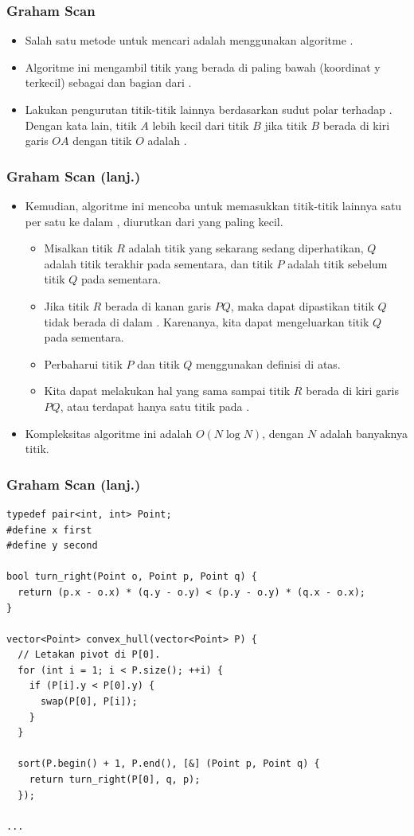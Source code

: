 \begin{frame}
\frametitle{Graham Scan}
\begin{itemize}
  \item Salah satu metode untuk mencari \fconvexHull adalah menggunakan algoritme .
  \item Algoritme ini mengambil titik yang berada di paling bawah (koordinat y terkecil) sebagai \fpivot dan bagian dari \fconvexHull.
  \item Lakukan pengurutan titik-titik lainnya berdasarkan sudut polar terhadap \fpivot. Dengan kata lain, titik $A$ lebih kecil dari titik $B$ jika titik $B$ berada di kiri garis $OA$ dengan titik $O$ adalah \fpivot.
\end{itemize}
\end{frame}

\begin{frame}
\frametitle{Graham Scan (lanj.)}
\begin{itemize}
  \item Kemudian, algoritme ini mencoba untuk memasukkan titik-titik lainnya satu per satu ke dalam \fconvexHull, diurutkan dari yang paling kecil.
  \begin{itemize}
    \item Misalkan titik $R$ adalah titik yang sekarang sedang diperhatikan, $Q$ adalah titik terakhir pada \fconvexHull sementara, dan titik $P$ adalah titik sebelum titik $Q$ pada \fconvexHull sementara.
    \item Jika titik $R$ berada di kanan garis $PQ$, maka dapat dipastikan titik $Q$ tidak berada di dalam \fconvexHull. Karenanya, kita dapat mengeluarkan titik $Q$ pada \fconvexHull sementara.
    \item Perbaharui titik $P$ dan titik $Q$ menggunakan definisi di atas.
    \item Kita dapat melakukan hal yang sama sampai titik $R$ berada di kiri garis $PQ$, atau terdapat hanya satu titik pada \fconvexHull.
  \end{itemize}
  \item Kompleksitas algoritme ini adalah $O(N \log N)$, dengan $N$ adalah banyaknya titik.
\end{itemize}
\end{frame}

\begin{frame}[fragile]
\frametitle{Graham Scan (lanj.)}
\begin{lstlisting}
typedef pair<int, int> Point;
#define x first
#define y second

bool turn_right(Point o, Point p, Point q) {
  return (p.x - o.x) * (q.y - o.y) < (p.y - o.y) * (q.x - o.x);
}

vector<Point> convex_hull(vector<Point> P) {
  // Letakan pivot di P[0].
  for (int i = 1; i < P.size(); ++i) {
    if (P[i].y < P[0].y) {
      swap(P[0], P[i]);
    }
  }

  sort(P.begin() + 1, P.end(), [&] (Point p, Point q) {
    return turn_right(P[0], q, p);
  });

...
\end{lstlisting}
\end{frame}

